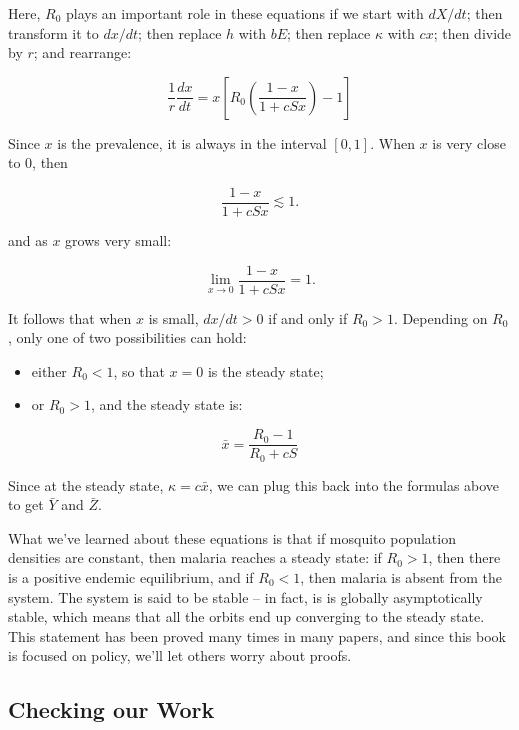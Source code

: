 \documentclass[
]{book}
\begin{document}
Here, \(R_0\) plays an important role in these equations if we start with \(dX/dt\); then transform it to \(dx/dt\); then replace \(h\) with \(bE\); then replace \(\kappa\) with \(cx\); then divide by \(r\); and rearrange:

\begin{equation}
\frac{1}{r} \frac{dx}{dt} = x \left[R_0 \left(\frac{1-x}{1 + cSx} \right)  - 1\right]  
\end{equation}

Since \(x\) is the prevalence, it is always in the interval \([0,1]\). When \(x\) is very close to \(0\), then

\begin{equation}
\frac{1-x}{1 + cSx} \lesssim 1. 
\end{equation}

and as \(x\) grows very small:

\begin{equation}
\lim_{x \rightarrow 0} \frac{1-x}{1 + cSx} = 1. 
\end{equation}

It follows that when \(x\) is small, \(dx/dt>0\) if and only if \(R_0 > 1\). Depending on \(R_0\), only one of two possibilities can hold:

\begin{itemize}
\item
  either \(R_0<1\), so that \(x=0\) is the steady state;
\item
  or \(R_0 > 1\), and the steady state is:
\end{itemize}

\begin{equation}
\bar x = \frac{R_0 -1}{R_0 + c S} 
\end{equation}

Since at the steady state, \(\kappa = c \bar x\), we can plug this back into the formulas above to get \(\bar Y\) and \(\bar Z\).

What we've learned about these equations is that if mosquito population densities are constant, then malaria reaches a steady state: if \(R_0 >1\), then there is a positive endemic equilibrium, and if \(R_0 < 1\), then malaria is absent from the system. The system is said to be stable -- in fact, is is globally asymptotically stable, which means that all the orbits end up converging to the steady state. This statement has been proved many times in many papers, and since this book is focused on policy, we'll let others worry about proofs.

\hypertarget{checking-our-work}{%
\subsection{Checking our Work}\label{checking-our-work}}
\end{document}
